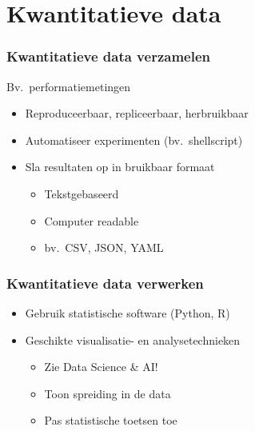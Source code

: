 \documentclass[aspectratio=169]{beamer}
\begin{document}
\section{Kwantitatieve data}

\begin{frame}
  \frametitle{Kwantitatieve data verzamelen}

  Bv.\ performatiemetingen

  \begin{itemize}
    \item Reproduceerbaar, repliceerbaar, herbruikbaar
    \item Automatiseer experimenten (bv.\ shellscript)
    \item Sla resultaten op in bruikbaar formaat
      \begin{itemize}
        \item Tekstgebaseerd
        \item Computer readable
        \item bv.\ CSV, JSON, YAML
      \end{itemize}
  \end{itemize}

\end{frame}

\begin{frame}
  \frametitle{Kwantitatieve data verwerken}

  \begin{itemize}
    \item Gebruik statistische software (Python, R)
    \item Geschikte visualisatie- en analysetechnieken
      \begin{itemize}
        \item Zie Data Science \& AI!
        \item Toon spreiding in de data
        \item Pas statistische toetsen toe
      \end{itemize}
  \end{itemize}

\end{frame}
  
\end{document}
